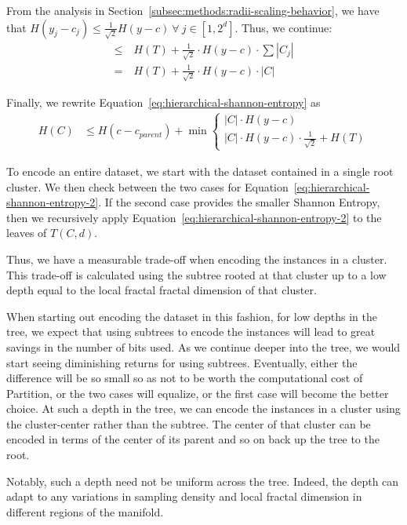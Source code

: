 From the analysis in Section~\ref{subsec:methods:radii-scaling-behavior}, we have that $H(y_j - c_j) \leq \frac{1}{\sqrt{2}} H(y - c) \ \forall \ j \in [1, 2^d]$.
Thus, we continue:
\begin{align*}
    \leq \ & H(T) + \frac{1}{\sqrt{2}} \cdot H(y - c) \cdot \sum |C_j| \\
    = \ & H(T) + \frac{1}{\sqrt{2}} \cdot H(y - c) \cdot |C|
\end{align*}

Finally, we rewrite Equation~\ref{eq:hierarchical-shannon-entropy} as
\begin{align}
    \label{eq:hierarchical-shannon-entropy-2}
    H(C) &\leq H(c - c_{parent}) + \min \begin{cases}
        |C| \cdot H(y - c) \\
        |C| \cdot H(y - c) \cdot \frac{1}{\sqrt{2}} + H(T)
    \end{cases}
\end{align}

To encode an entire dataset, we start with the dataset contained in a single root cluster.
We then check between the two cases for Equation~\ref{eq:hierarchical-shannon-entropy-2}.
If the second case provides the smaller Shannon Entropy, then we recursively apply Equation~\ref{eq:hierarchical-shannon-entropy-2} to the leaves of $T(C,d)$.

Thus, we have a measurable trade-off when encoding the instances in a cluster.
This trade-off is calculated using the subtree rooted at that cluster up to a low depth equal to the local fractal fractal dimension of that cluster.

When starting out encoding the dataset in this fashion, for low depths in the tree, we expect that using subtrees to encode the instances will lead to great savings in the number of bits used.
As we continue deeper into the tree, we would start seeing diminishing returns for using subtrees.
Eventually, either 
the difference will be so small so as not to be worth the computational cost of Partition, 
or the two cases will equalize, 
or the first case will become the better choice.
At such a depth in the tree, we can encode the instances in a cluster using the cluster-center rather than the subtree.
The center of that cluster can be encoded in terms of the center of its parent and so on back up the tree to the root.

Notably, such a depth need not be uniform across the tree.
Indeed, the depth can adapt to any variations in sampling density and local fractal dimension in different regions of the manifold.
